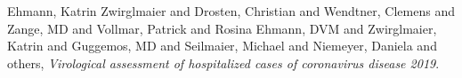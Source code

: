 \documentclass[twoside]{article}
\begin{document}
\begin{thebibliography}{0}
 Ehmann, Katrin Zwirglmaier and Drosten, Christian and Wendtner, Clemens and Zange, MD and Vollmar, Patrick and Rosina Ehmann, DVM and Zwirglmaier, Katrin and Guggemos, MD and Seilmaier, Michael and Niemeyer, Daniela and others, \textit{Virological assessment of hospitalized cases of coronavirus disease 2019}.
%
\end{thebibliography}
\end{document}
